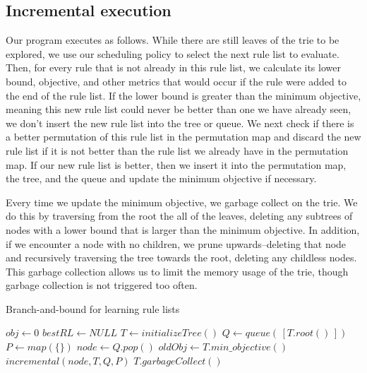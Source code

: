 \subsection{Incremental execution}
Our program executes as follows. 
While there are still leaves of the trie to be explored, we use our scheduling policy to select the next rule list to evaluate.
Then, for every rule that is not already in this rule list, we calculate its lower bound, objective, and other metrics that would occur if the rule were added to the end of the rule list.
If the lower bound is greater than the minimum objective, meaning this new rule list could never be better than one we have already seen, we don't insert the new rule list into the tree or queue.
We next check if there is a better permutation of this rule list in the permutation map and discard the new rule list if it is not better than the rule list we already have in the permutation map.
If our new rule list is better, then we insert it into the permutation map, the tree, and the queue and update the minimum objective if necessary.

Every time we update the minimum objective, we garbage collect on the trie.
We do this by traversing from the root the all of the leaves, deleting any subtrees of nodes with a lower bound that is larger than the minimum objective.
In addition, if we encounter a node with no children, we prune upwards--deleting that node and recursively traversing the tree towards the root, deleting any childless nodes.
This garbage collection allows us to limit the memory usage of the trie, though garbage collection is not triggered too often.

\begin{algorithm}[t!]
  \caption{Branch-and-bound for learning rule lists}
\label{alg:branch-and-bound}
\begin{algorithmic}
\normalsize
\State $obj \gets 0$
\State $bestRL \gets NULL$
\State $T \gets initializeTree()$
\State $Q \gets queue(\,[T.root()\,])$
\State $P \gets map(\{\})$
	\State $node \gets Q.pop()$
	\State $oldObj \gets T.min\_objective()$
	\State $incremental(node, T, Q, P)$ 
		\State $T.garbageCollect()$
	\EndIf
\EndWhile


\end{algorithmic}
\end{algorithm}

